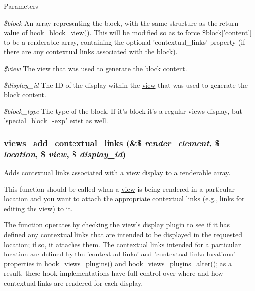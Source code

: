 \begin{DoxyParams}{Parameters}
\item[{\em \$block}]An array representing the block, with the same structure as the return value of \hyperlink{group__hooks_gaa14092a3e74cdc57aa295100cfd6860d}{hook\_\-block\_\-view()}. This will be modified so as to force \$block\mbox{[}'content'\mbox{]} to be a renderable array, containing the optional 'contextual\_\-links' property (if there are any contextual links associated with the block). \item[{\em \$view}]The \hyperlink{classview}{view} that was used to generate the block content. \item[{\em \$display\_\-id}]The ID of the display within the \hyperlink{classview}{view} that was used to generate the block content. \item[{\em \$block\_\-type}]The type of the block. If it's block it's a regular views display, but 'special\_\-block\_\--\/exp' exist as well. \end{DoxyParams}
\hypertarget{views_8module_ada5efae53eaaac7b5d9a1411aae14138}{
\subsubsection[{views\_\-add\_\-contextual\_\-links}]{\setlength{\rightskip}{0pt plus 5cm}views\_\-add\_\-contextual\_\-links (\&\$ {\em render\_\-element}, \/  \$ {\em location}, \/  \$ {\em view}, \/  \$ {\em display\_\-id})}}
\label{views_8module_ada5efae53eaaac7b5d9a1411aae14138}
Adds contextual links associated with a \hyperlink{classview}{view} display to a renderable array.

This function should be called when a \hyperlink{classview}{view} is being rendered in a particular location and you want to attach the appropriate contextual links (e.g., links for editing the \hyperlink{classview}{view}) to it.

The function operates by checking the view's display plugin to see if it has defined any contextual links that are intended to be displayed in the requested location; if so, it attaches them. The contextual links intended for a particular location are defined by the 'contextual links' and 'contextual links locations' properties in \hyperlink{group__views__hooks_ga23f6e9972b2ed84fc54b7ff63f44477d}{hook\_\-views\_\-plugins()} and \hyperlink{group__views__hooks_ga6c4e4c2a769b0017bf0edcd0adae57e9}{hook\_\-views\_\-plugins\_\-alter()}; as a result, these hook implementations have full control over where and how contextual links are rendered for each display.

